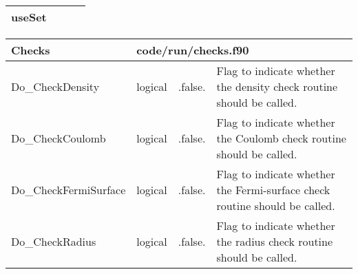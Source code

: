 \documentclass{article}
\begin{document}
\begin{longtable}{llll}
\midrule
useSet & \begin{minipage}[t]{2cm}\end{minipage} & \begin{minipage}[t]{2cm}\end{minipage} & \begin{minipage}[t]{12cm}\end{minipage}\\*
\bottomrule
\end{longtable}
{ }




\begin{longtable}{llll}
\toprule
\textbf{\large{Checks}} & \multicolumn{3}{l}{\footnotesize{code/run/checks.f90}}\\*
\midrule
\endfirsthead
\midrule
\endhead
Do\_CheckDensity & \begin{minipage}[t]{2cm}logical\end{minipage} & \begin{minipage}[t]{2cm}.false.\end{minipage} & \begin{minipage}[t]{12cm}Flag to indicate whether the density check routine should be called.\end{minipage}\\*
\midrule
Do\_CheckCoulomb & \begin{minipage}[t]{2cm}logical\end{minipage} & \begin{minipage}[t]{2cm}.false.\end{minipage} & \begin{minipage}[t]{12cm}Flag to indicate whether the Coulomb check routine should be called.\end{minipage}\\*
\midrule
Do\_CheckFermiSurface & \begin{minipage}[t]{2cm}logical\end{minipage} & \begin{minipage}[t]{2cm}.false.\end{minipage} & \begin{minipage}[t]{12cm}Flag to indicate whether the Fermi-surface check routine should be called.\end{minipage}\\*
\midrule
Do\_CheckRadius & \begin{minipage}[t]{2cm}logical\end{minipage} & \begin{minipage}[t]{2cm}.false.\end{minipage} & \begin{minipage}[t]{12cm}Flag to indicate whether the radius check routine should be called.\end{minipage}\\*

\end{longtable}
\end{document}
